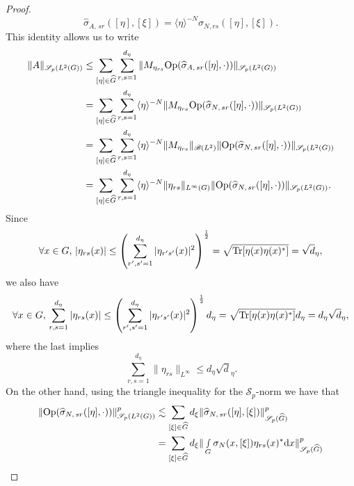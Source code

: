 \documentclass[12pt, reqno]{amsart}
\theoremstyle{definition}
\theoremstyle{remark}
\numberwithin{equation}{section}
\begin{document}
\begin{proof}
\begin{equation}
 \widehat{\sigma}_{A,\,sr }([\eta],[\xi]) =  \langle\eta\rangle^{-N}\widehat{\sigma}_{N,rs}([\eta],[\xi]).
\end{equation}This identity allows us to write
\begin{align*}
    \Vert A \Vert_{\mathscr{S}_p(L^2(G))} &\leq \sum_{[\eta]\in \widehat{G}}\sum_{r,s=1}^{d_\eta}\Vert M_{\eta_{rs}}\textnormal{Op}(\widehat{\sigma}_{A,\,sr }([\eta],\cdot))\Vert_{\mathscr{S}_p(L^2(G))}\\
    &=\sum_{[\eta]\in \widehat{G}}\sum_{r,s=1}^{d_\eta}\langle \eta\rangle^{-N}\Vert M_{\eta_{rs}}\textnormal{Op}(\widehat{\sigma}_{N,\,sr }([\eta],\cdot))\Vert_{\mathscr{S}_p(L^2(G))}\\
    &=\sum_{[\eta]\in \widehat{G}}\sum_{r,s=1}^{d_\eta}\langle \eta\rangle^{-N}\Vert M_{\eta_{rs}}\Vert_{\mathscr{B}(L^2)}\Vert\textnormal{Op}(\widehat{\sigma}_{N,\,sr }([\eta],\cdot ))\Vert_{\mathscr{S}_p(L^2(G))}\\
    &=\sum_{[\eta]\in \widehat{G}}\sum_{r,s=1}^{d_\eta}\langle \eta\rangle^{-N}\Vert \eta_{rs}\Vert_{L^\infty(G)}\Vert\textnormal{Op}(\widehat{\sigma}_{N,\,sr }([\eta],\cdot ))\Vert_{\mathscr{S}_p(L^2(G))}.
\end{align*}
Since
\begin{equation}\label{estimate:eta:sr}
 \forall x\in G,\,  |\eta_{rs}(x)|\leq \left(\sum_{r',s'=1}^{d_{\eta}}|\eta_{r's'}(x)|^2\right)^{\frac{1}{2}}=\sqrt{\textnormal{Tr}[\eta(x)\eta(x)^{*}]}=\sqrt{d}_\eta,
\end{equation}
we also have
\begin{equation}
   \forall x\in G,\,\sum_{r,s=1}^{d_\eta} |\eta_{rs}(x)|\leq \left(\sum_{r',s'=1}^{d_{\eta}}|\eta_{r's'}(x)|^2\right)^{\frac{1}{2}}d_\eta=\sqrt{\textnormal{Tr}[\eta(x)\eta(x)^{*}]}d_\eta=d_\eta\sqrt{d}_\eta,
\end{equation} where the last implies
\begin{equation}
  \,\sum_{r,s=1}^{d_\eta} \|\eta_{rs}\|_{L^\infty}\leq d_\eta\sqrt{d}_\eta.
\end{equation}
On the other hand, using the triangle inequality for the $\mathscr{S}_p$-norm we have that
\begin{align*}
  \Vert\textnormal{Op}(\widehat{\sigma}_{N,\,sr }([\eta],\cdot ))\Vert^{p}_{\mathscr{S}_p(L^2(G))}
  &\lesssim\sum_{[\xi]\in \widehat{G}}d_\xi  \Vert \widehat{\sigma}_{N,\,sr }([\eta],[\xi])\Vert_{\mathscr{S}_p(\widehat{G})}^{p}\\
  &=\sum_{[\xi]\in \widehat{G}}d_\xi  \Vert\smallint\limits_{G} {\sigma}_{N}(x,[\xi])\eta_{rs}(x)^{*}\textnormal{d}x\Vert_{\mathscr{S}_p(\widehat{G})}^{p}\\

\end{align*}
\end{proof}
\end{document}
